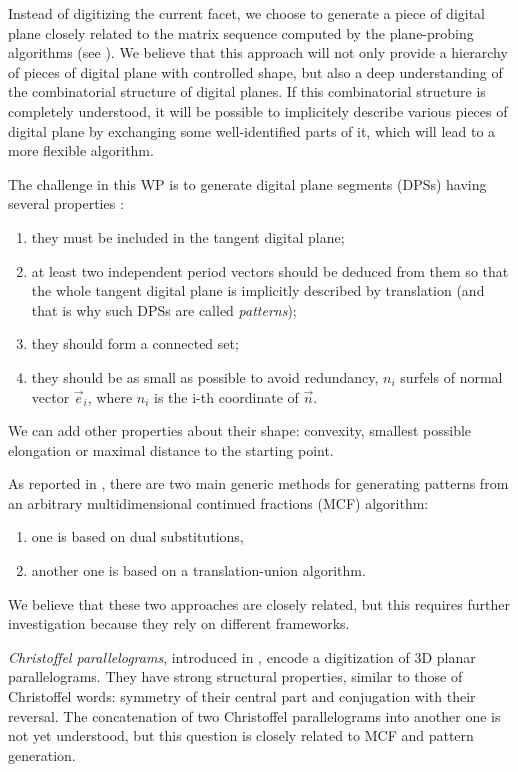Instead of digitizing the current facet, we choose to generate a piece
of digital plane closely related to the matrix sequence computed by
the plane-probing algorithms (see ). We believe that
this approach will not only provide a hierarchy of pieces of digital
plane with controlled shape, but also a deep understanding of the
combinatorial structure of digital planes. If this combinatorial
structure is completely understood, it will be possible to implicitely
describe various pieces of digital plane by exchanging some well-identified
parts of it, which will lead to a more flexible algorithm. 

The challenge in this WP is to generate digital plane segments (DPSs)
having several properties \cite{Jamet2016}:
\begin{enumerate}[label=(P\arabic*)]
\item they must be included in the tangent digital plane; \label{prop:inside}
\item at least two independent period vectors should be deduced from them
  so that the whole tangent digital plane is implicitly described by translation
  (and that is why such DPSs are called \emph{patterns}); \label{prop:period}
\item they should form a connected set; \label{prop:connect}
\item they should be as small as possible to avoid redundancy,
  \eg $n_i$ surfels of normal vector $\vec{e}_i$, where $n_i$ is the i-th coordinate
  of $\vec{n}$. \label{prop:small}
\end{enumerate}
We can add other properties about their shape: 
convexity, smallest possible elongation or maximal distance to the starting point.

As reported in , there are two main generic methods for generating patterns
from an arbitrary multidimensional continued fractions (MCF) algorithm:
\begin{enumerate}[label=(M\arabic*)]
\item one is based on dual substitutions, \label{m:sub}
\item another one is based on a translation-union algorithm. \label{m:tu}
\end{enumerate}
We believe that these two approaches are closely related, but this requires
further investigation because they rely on different frameworks. 

\emph{Christoffel parallelograms}, introduced in \cite{Labbe2015},
encode a digitization of 3D planar parallelograms. They have strong
structural properties, similar to those of Christoffel words:
symmetry of their central part and conjugation with their reversal.
The concatenation of two Christoffel parallelograms into another one
is not yet understood, but this question is closely related to MCF
and pattern generation. 

